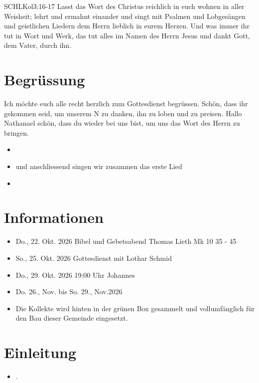 \documentclass[fontsize=14pt]{mybib}
\author{OTS}
\newcommand{\Name}{Nathanael}
\begin{document}
\begin{bibelbox}{SCHL}{Kol}{3:16-17}
    Lasst das Wort des Christus reichlich in euch wohnen in aller Weisheit; lehrt und ermahnt einander und singt mit Psalmen und Lobgesängen und geistlichen Liedern dem Herrn lieblich in eurem Herzen. Und was immer ihr tut in Wort und Werk, das tut alles im Namen des Herrn Jesus und dankt Gott, dem Vater, durch ihn.
\end{bibelbox}
\section{Begrüssung}
Ich möchte euch alle recht herzlich zum Gottesdienst begrüssen. Schön, dass ihr gekommen seid, um unserem \herr N zu danken, ihn zu loben und zu preisen. 
Hallo \Name{} schön, dass du wieder bei uns bist, um uns das Wort des Herrn zu bringen.

\begin{itemize}
    \item {}
    \item und anschliessend singen wir zusammen das erste Lied
    \item {}
\end{itemize}

\section{Informationen}
\begin{itemize}
    \item {} Do., 22. Okt. 2026 Bibel und Gebetsabend Thomas Lieth Mk 10 35 - 45
    \item {} So., 25. Okt. 2026 Gottesdienst  mit Lothar Schmid
    \item {} Do., 29. Okt. 2026 19:00 Uhr Johannes   
    \item {} Do. 26., Nov. bis So. 29., Nov.2026 
    \item {} Die Kollekte wird hinten in der grünen Box gesammelt und vollumfänglich für den Bau dieser Gemeinde eingesetzt.
\end{itemize}
\section{Einleitung}

\begin{itemize}
    \item {}.
\end{itemize}
\end{document}
